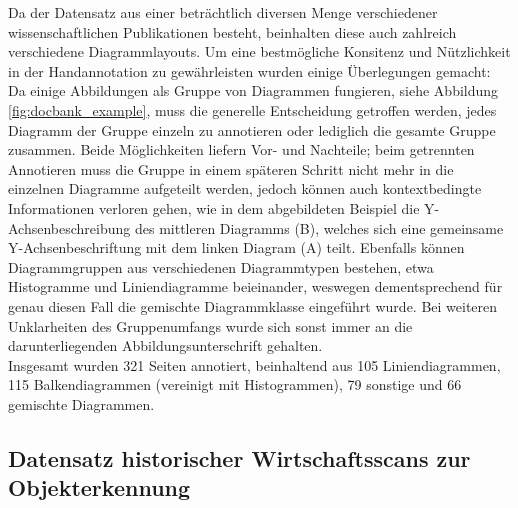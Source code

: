 Da der Datensatz aus einer beträchtlich diversen Menge verschiedener wissenschaftlichen Publikationen besteht, beinhalten diese auch zahlreich verschiedene Diagrammlayouts. Um eine bestmögliche Konsitenz und Nützlichkeit in der Handannotation zu gewährleisten wurden einige Überlegungen gemacht: Da einige Abbildungen als Gruppe von Diagrammen fungieren, siehe Abbildung \ref{fig:docbank_example}, muss die generelle Entscheidung getroffen werden, jedes Diagramm der Gruppe einzeln zu annotieren oder lediglich die gesamte Gruppe zusammen. Beide Möglichkeiten liefern Vor- und Nachteile; beim getrennten Annotieren muss die Gruppe in einem späteren Schritt nicht mehr in die einzelnen Diagramme aufgeteilt werden, jedoch können auch kontextbedingte Informationen verloren gehen, wie in dem abgebildeten Beispiel die Y-Achsenbeschreibung des mittleren Diagramms (B), welches sich eine gemeinsame Y-Achsenbeschriftung mit dem linken Diagram (A) teilt.
Ebenfalls können Diagrammgruppen aus verschiedenen Diagrammtypen bestehen, etwa Histogramme und Liniendiagramme beieinander, weswegen dementsprechend für genau diesen Fall die gemischte Diagrammklasse eingeführt wurde. Bei weiteren Unklarheiten des Gruppenumfangs wurde sich sonst immer an die darunterliegenden Abbildungsunterschrift gehalten.
\\
Insgesamt wurden 321 Seiten annotiert, beinhaltend aus 105 Liniendiagrammen, 115 Balkendiagrammen (vereinigt mit Histogrammen), 79 sonstige und 66 gemischte Diagrammen.

\subsection{Datensatz historischer Wirtschaftsscans zur Objekterkennung}
\label{ch:scanbank}

